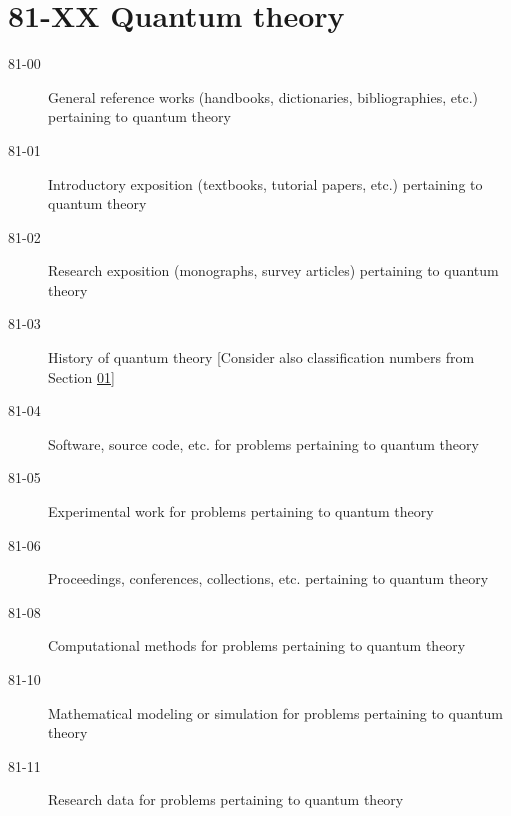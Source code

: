 \section*{81-XX Quantum theory }\label{81-XX}
\begin{description}
\item [81-00]\label{81-00} General reference works (handbooks, dictionaries, bibliographies, etc.) pertaining to quantum theory
\item [81-01]\label{81-01} Introductory exposition (textbooks, tutorial papers, etc.) pertaining to quantum theory
\item [81-02]\label{81-02} Research exposition (monographs, survey articles) pertaining to quantum theory
\item [81-03]\label{81-03} History of quantum theory [Consider also classification numbers from Section \hyperref[01-XX]{01}]
\item [81-04]\label{81-04} Software, source code, etc. for problems pertaining to quantum theory
\item [81-05]\label{81-05} Experimental work for problems pertaining to quantum theory
\item [81-06]\label{81-06} Proceedings, conferences, collections, etc. pertaining to quantum theory
\item [81-08]\label{81-08} Computational methods for problems pertaining to quantum theory
\item [81-10]\label{81-10} Mathematical modeling or simulation for problems pertaining to quantum theory
\item [81-11]\label{81-11} Research data for problems pertaining to quantum theory
\end{description}
